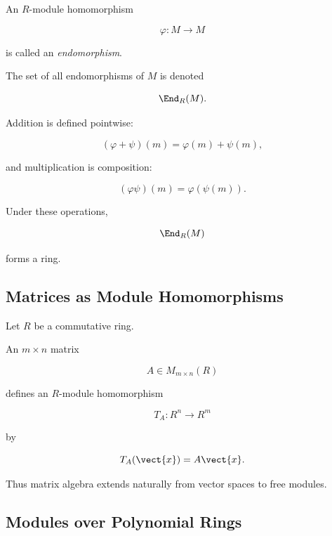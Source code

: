 An \(R\)-module homomorphism

\[ \varphi:M\to M \]

is called an \emph{endomorphism}.

The set of all endomorphisms of \(M\) is denoted

\[ \End_R(M). \]

Addition is defined pointwise:

\[ (\varphi+\psi)(m)=\varphi(m)+\psi(m), \]

and multiplication is composition:

\[ (\varphi\psi)(m)=\varphi(\psi(m)). \]

Under these operations,

\[ \End_R(M) \]

forms a ring.

\subsection{Matrices as Module Homomorphisms}
\label{subsec:matrices-module-homomorphisms}

Let \(R\) be a commutative ring.

An \(m\times n\) matrix

\[ A\in M_{m\times n}(R) \]

defines an \(R\)-module homomorphism

\[ T_A:R^n\to R^m \]

by

\[ T_A(\vect{x})=A\vect{x}. \]

Thus matrix algebra extends naturally from vector spaces to free modules.

\begin{center}
\end{center}

\subsection{Modules over Polynomial Rings}
\label{subsec:modules-polynomial-rings}

